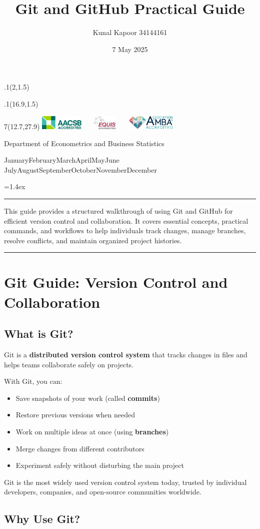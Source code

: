 \documentclass[
  11pt,
  a4paper,
]{article}
\title{Git and GitHub Practical Guide}
\date{7 May 2025}
\author{Kunal Kapoor \textbar{} 34144161}
\makeatletter
\def\placefig#1#2#3#4{\begin{textblock}{.1}(#1,#2)\rlap{\texttt{[image: \#4]}}\end{textblock}}
\def\Month{\ifcase\month\or
 January\or February\or March\or April\or May\or June\or
 July\or August\or September\or October\or November\or December\fi}
\def\Year{\number\year}
\def\cover{{\sffamily\setcounter{page}{0}
        \thispagestyle{empty}
        \placefig{2}{1.5}{width=5cm}{monash2}
        \placefig{16.9}{1.5}{width=2.1cm}{MBSportrait}
        \begin{textblock}{7}(12.7,27.9)\hfill
        \includegraphics[height=0.7cm]{AACSB}~~~
        \includegraphics[height=0.7cm]{EQUIS}~~~
        \includegraphics[height=0.7cm]{AMBA}
        \end{textblock}
        \vspace*{2.5cm}
        \begin{center}\Large
        Department of Econometrics and Business Statistics\\[.5cm]
        \end{center}\vspace{2cm}
        \begin{center}
        \fbox{\parbox{14cm}{\begin{onehalfspace}\centering\Huge\vspace*{0.3cm}
                \textsf{\textbf{\expandafter{\@title}}}\vspace{1cm}\par
                \LARGE
                \expandafter{\@author}
                \end{onehalfspace}
        }}
        \end{center}
        \vfill
                \begin{center}\Large
                \Month~\Year\\[1cm]

        \end{center}\vspace*{2cm}}}
\def\titlepage{{\cover}}
\let\maketitle\titlepage
\renewenvironment{abstract}{\begin{minipage}{\textwidth}\parskip=1.4ex\noindent
\hrule\vspace{0.1cm}\par{\sffamily\textbf{\abstractname}}\newline\setstretch{1.5}}
  {\end{minipage}}
\makeatother
\begin{document}
\maketitle

\begin{abstract}
This guide provides a structured walkthrough of using Git and GitHub for
efficient version control and collaboration. It covers essential
concepts, practical commands, and workflows to help individuals track
changes, manage branches, resolve conflicts, and maintain organized
project histories.
\end{abstract}

    \vspace{0.25cm}\par\hrule\vspace{0.5cm}\par
  

\section{Git Guide: Version Control and
Collaboration}\label{git-guide-version-control-and-collaboration}

\subsection{What is Git?}\label{what-is-git}

Git is a \textbf{distributed version control system} that tracks changes
in files and helps teams collaborate safely on projects.

With Git, you can:

\begin{itemize}
\item
  Save snapshots of your work (called \textbf{commits})
\item
  Restore previous versions when needed
\item
  Work on multiple ideas at once (using \textbf{branches})
\item
  Merge changes from different contributors
\item
  Experiment safely without disturbing the main project
\end{itemize}

Git is the most widely used version control system today, trusted by
individual developers, companies, and open-source communities worldwide.

\newpage

\subsection{Why Use Git?}\label{why-use-git}
\end{document}
